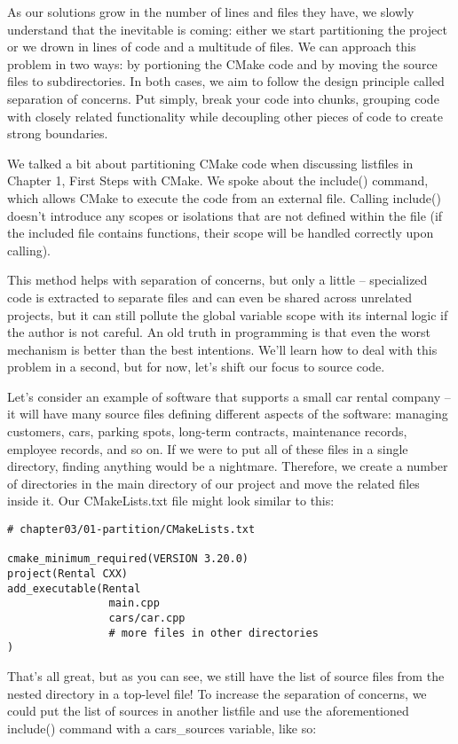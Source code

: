 
As our solutions grow in the number of lines and files they have, we slowly understand that the inevitable is coming: either we start partitioning the project or we drown in lines of code and a multitude of files. We can approach this problem in two ways: by portioning the CMake code and by moving the source files to subdirectories. In both cases, we aim to follow the design principle called separation of concerns. Put simply, break your code into chunks, grouping code with closely related functionality while decoupling other pieces of code to create strong boundaries.

We talked a bit about partitioning CMake code when discussing listfiles in Chapter 1, First Steps with CMake. We spoke about the include() command, which allows CMake to execute the code from an external file. Calling include() doesn't introduce any scopes or isolations that are not defined within the file (if the included file contains functions, their scope will be handled correctly upon calling).

This method helps with separation of concerns, but only a little – specialized code is extracted to separate files and can even be shared across unrelated projects, but it can still pollute the global variable scope with its internal logic if the author is not careful. An old truth in programming is that even the worst mechanism is better than the best intentions.
We'll learn how to deal with this problem in a second, but for now, let's shift our focus to source code.

Let's consider an example of software that supports a small car rental company – it will have many source files defining different aspects of the software: managing customers, cars, parking spots, long-term contracts, maintenance records, employee records, and so on. If we were to put all of these files in a single directory, finding anything would be a nightmare. Therefore, we create a number of directories in the main directory of our project and move the related files inside it. Our CMakeLists.txt file might look similar to this:

\begin{lstlisting}[style=styleCMake]
# chapter03/01-partition/CMakeLists.txt

cmake_minimum_required(VERSION 3.20.0)
project(Rental CXX)
add_executable(Rental
				main.cpp
				cars/car.cpp
				# more files in other directories
)
\end{lstlisting}

That's all great, but as you can see, we still have the list of source files from the nested directory in a top-level file! To increase the separation of concerns, we could put the list of sources in another listfile and use the aforementioned include() command with a cars\_sources variable, like so:

